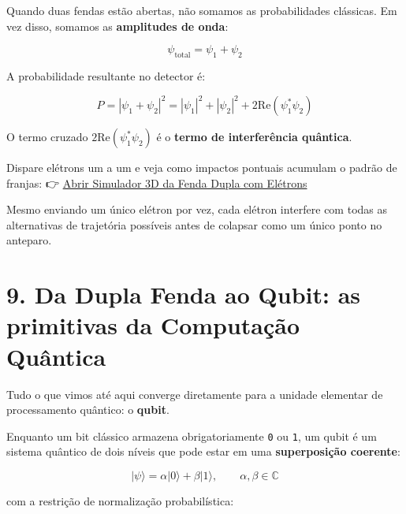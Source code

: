 \documentclass[
  brazilian,
]{report}
\begin{document}
Quando duas fendas estão abertas, não somamos as probabilidades
clássicas. Em vez disso, somamos as \textbf{amplitudes de onda}:

\[
\psi_{\text{total}} = \psi_1 + \psi_2
\]

A probabilidade resultante no detector é:

\[
P = |\psi_1 + \psi_2|^2 = |\psi_1|^2 + |\psi_2|^2 + 2\text{Re}(\psi_1^* \psi_2)
\]

O termo cruzado \(2\text{Re}(\psi_1^* \psi_2)\) é o \textbf{termo de
interferência quântica}.

\begin{tcolorbox}[enhanced jigsaw, arc=.35mm, bottomrule=.15mm, bottomtitle=1mm, breakable, colback=white, colbacktitle=quarto-callout-tip-color!10!white, colframe=quarto-callout-tip-color-frame, coltitle=black, left=2mm, leftrule=.75mm, opacityback=0, opacitybacktitle=0.6, rightrule=.15mm, title=\textcolor{quarto-callout-tip-color}{\faLightbulb}\hspace{0.5em}{🧪 Simulador 3D da Dupla Fenda com Elétrons}, titlerule=0mm, toprule=.15mm, toptitle=1mm]

Dispare elétrons um a um e veja como impactos pontuais acumulam o padrão
de franjas: 👉
\href{./assets/simuladores/simulador-fenda-dupla-eletrons-v4.html}{Abrir
Simulador 3D da Fenda Dupla com Elétrons}

\end{tcolorbox}

Mesmo enviando um único elétron por vez, cada elétron interfere com
todas as alternativas de trajetória possíveis antes de colapsar como um
único ponto no anteparo.

\section{9. Da Dupla Fenda ao Qubit: as primitivas da Computação
Quântica}\label{da-dupla-fenda-ao-qubit-as-primitivas-da-computauxe7uxe3o-quuxe2ntica}

Tudo o que vimos até aqui converge diretamente para a unidade elementar
de processamento quântico: o \textbf{qubit}.

Enquanto um bit clássico armazena obrigatoriamente \texttt{0} ou
\texttt{1}, um qubit é um sistema quântico de dois níveis que pode estar
em uma \textbf{superposição coerente}:

\[
|\psi\rangle = \alpha |0\rangle + \beta |1\rangle, \qquad \alpha, \beta \in \mathbb{C}
\]

com a restrição de normalização probabilística:
\end{document}
